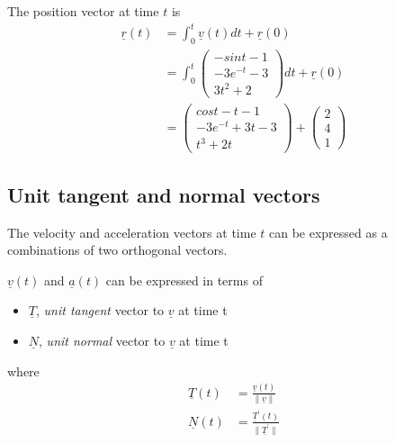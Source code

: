 \begin{framed}
  The position vector at time $t$ is
  \begin{align*}
     \underline{r}(t) &= \int_{0}^{t} \underline{v}(t)dt + \underline{r}(0)\\
                       &= \int_{0}^{t}\begin{pmatrix} 
                         -sint - 1\\
                         -3e^{-t} - 3 \\
                         3t^2 +2
                       \end{pmatrix} dt + \underline{r}(0) \\
                       &= \begin{pmatrix} 
                         cost - t - 1\\
                         -3e^{-t} + 3t -3 \\
                         t^3 + 2t
                       \end{pmatrix} + \begin{pmatrix} 
                         2 \\4 \\ 1  
                       \end{pmatrix}
  \end{align*}
\end{framed}

\subsection{Unit tangent and normal vectors}

The velocity and acceleration vectors at time $t$ can be expressed as a combinations of two orthogonal vectors.

\begin{framed}
   $ \underline{v}(t)$ and $ \underline{a}(t)$ can be expressed in terms of
   \begin{itemize}
      \item $ \underline{T}$, \emph{unit tangent} vector to $ \underline{v}$ at time t
      \item $ \underline{N}$, \emph{unit normal} vector to $ \underline{v}$ at time t
   \end{itemize}

   where 
   \begin{align*}
      \underline{T}(t) &= \frac{ \underline{v}(t)}{ \lVert \underline{v} \rVert } \\
      \underline{N}(t) &= \frac{ \underline{T}^{\prime}(t)}{ \lVert \underline{T}^{\prime} \rVert } \\
   \end{align*}
\end{framed}


